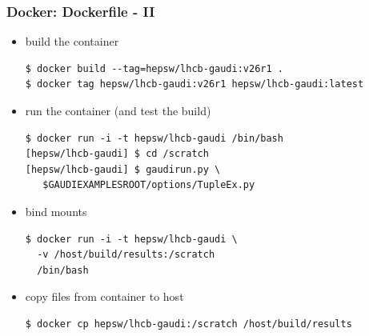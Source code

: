 \documentclass[9pt]{beamer}
\newcommand{\myblue} [1] {{\color{blue}#1}}
\begin{document}
\begin{frame}[fragile]
\frametitle{Docker: Dockerfile - II}
\begin{block}{}
\begin{itemize}
  \item build the container
\begin{verbatim}
$ docker build --tag=hepsw/lhcb-gaudi:v26r1 .
$ docker tag hepsw/lhcb-gaudi:v26r1 hepsw/lhcb-gaudi:latest
\end{verbatim}
\end{itemize}
\end{block}

\begin{block}{}
\begin{itemize}
  \item run the container (and test the build)
\begin{verbatim}
$ docker run -i -t hepsw/lhcb-gaudi /bin/bash
[hepsw/lhcb-gaudi] $ cd /scratch
[hepsw/lhcb-gaudi] $ gaudirun.py \
   $GAUDIEXAMPLESROOT/options/TupleEx.py
\end{verbatim}

 \item bind mounts
\begin{verbatim}
$ docker run -i -t hepsw/lhcb-gaudi \
  -v /host/build/results:/scratch
  /bin/bash
\end{verbatim}

 \item copy files from container to host
\begin{verbatim}
$ docker cp hepsw/lhcb-gaudi:/scratch /host/build/results
\end{verbatim}

\end{itemize}
\end{block}
\end{frame}


\end{document}
